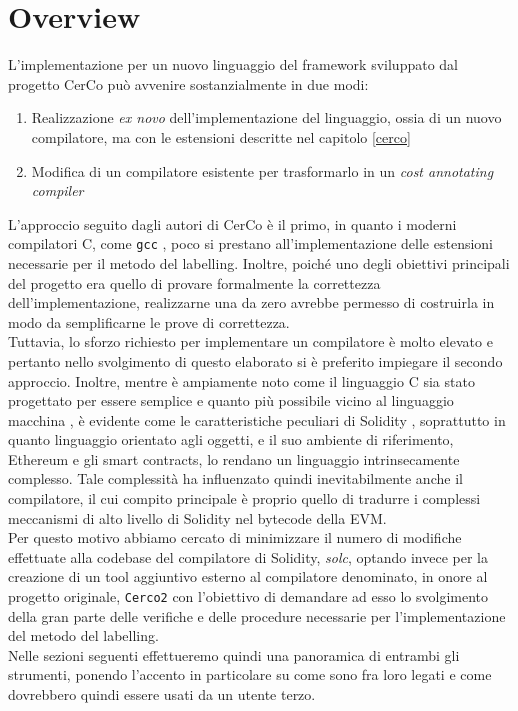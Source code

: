 \documentclass[12pt,a4paper,openright,oneside]{report}
\theoremstyle{definition}
\begin{document}
\section{Overview}\label{impl:overview}
L'implementazione per un nuovo linguaggio del framework sviluppato dal progetto CerCo pu\`{o} avvenire sostanzialmente in due modi: 
\begin{enumerate}
    \item Realizzazione \textit{ex novo} dell'implementazione del linguaggio, ossia di un nuovo compilatore, ma con le estensioni descritte nel capitolo \ref{cerco}
    \item Modifica di un compilatore esistente per trasformarlo in un \textit{cost annotating compiler}
\end{enumerate}
L'approccio seguito dagli autori di CerCo \`{e} il primo, in quanto i moderni compilatori C, come \texttt{gcc} \cite{gcc}, poco si prestano all'implementazione delle estensioni necessarie per il metodo del labelling. Inoltre, poich\'{e} uno degli obiettivi principali del progetto era quello di provare formalmente la correttezza dell'implementazione, realizzarne una da zero avrebbe permesso di costruirla in modo da semplificarne le prove di correttezza.\\ 
Tuttavia, lo sforzo richiesto per implementare un compilatore \`{e} molto elevato e pertanto nello svolgimento di questo elaborato si \`{e} preferito impiegare il secondo approccio. Inoltre, mentre \`{e} ampiamente noto come il linguaggio C sia stato progettato per essere semplice e quanto pi\`{u} possibile vicino al linguaggio macchina \cite{torvalds}, \`{e} evidente come le caratteristiche peculiari di Solidity \cite{solc}, soprattutto in quanto linguaggio orientato agli oggetti, e il suo ambiente di riferimento, Ethereum e gli smart contracts, lo rendano un linguaggio intrinsecamente complesso. Tale complessit\`{a} ha influenzato quindi inevitabilmente anche il compilatore, il cui compito principale \`{e} proprio quello di tradurre i complessi meccanismi di alto livello di Solidity nel bytecode della EVM.\\
Per questo motivo abbiamo cercato di minimizzare il numero di modifiche effettuate alla codebase del compilatore di Solidity, \textit{solc}, optando invece per la creazione di un tool aggiuntivo esterno al compilatore denominato, in onore al progetto originale, \texttt{Cerco2}\cite{repo_thesis} con l'obiettivo di demandare ad esso lo svolgimento della gran parte delle verifiche e delle procedure necessarie per l'implementazione del metodo del labelling.\\
Nelle sezioni seguenti effettueremo quindi una panoramica di entrambi gli strumenti, ponendo l'accento in particolare su come sono fra loro legati e come dovrebbero quindi essere usati da un utente terzo.
\end{document}
